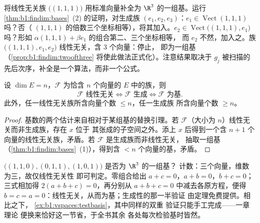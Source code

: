 \begin{example}[运行补全算法]
\label{ex:b1:findim:completion}
将线性无关族 $\bigl((1,1,1)\bigr)$ 用标准向量补全为
$\R^3$ 的一组基。运行
\cref{thm:b1:findim:bases}~(2) 的证明，对生成族 $(e_1,
e_2, e_3)$：$e_1 \in \operatorname{Vect}(1,1,1)$ 吗？否（
$(1,1,1)$ 的倍数三个坐标相等），将其加入。$e_2 \in
\operatorname{Vect}\bigl((1,1,1), e_1\bigr)$ 吗？形如
$\alpha(1,1,1) + \beta e_1$ 的组合第二、三个坐标相等，
而 $e_2$ 不然，加入之。族
$\bigl((1,1,1), e_1, e_2\bigr)$ 线性无关，含 $3$ 个向量：停止，
即为一组基（\cref{prop:b1:findim:twoofthree}
将使此做法正式化）。注意结果取决于
$g_j$ 被扫描的先后次序，补全是一个算法，而非一个公式。
\end{example}

\begin{proposition}[三取二规则]\label{prop:b1:findim:twoofthree}
设 $\dim E = n$，$\mathcal{F}$ 为恰含 $n$ 个向量的
$E$ 中的族，则
\[
\mathcal{F} \text{ 线性无关} \iff \mathcal{F} \text{ 生成} \iff
\mathcal{F} \text{ 为基}.
\]
此外，任一线性无关族所含向量个数 $\leq n$，任一生成族
所含向量个数 $\geq n$。
\end{proposition}

\begin{proof}
基数的两个估计来自相对于某组基的替换引理。若
$\mathcal{F}$（大小为 $n$）线性无关而非生成族，存在 $x$ 位于
其张成的子空间之外。添上 $x$ 后得到一个含 $n + 1$
个向量的线性无关族，矛盾。若 $\mathcal{F}$ 是生成族而非线性无关，
抽取一组基（\cref{thm:b1:findim:bases}~(1)），得到含
$< n$ 个向量的基，矛盾。
\end{proof}

\begin{example}
\label{ex:b1:findim:twoofthreerun}
$\bigl((1,1,0), (0,1,1), (1,0,1)\bigr)$ 是否为 $\R^3$ 的一组基？
计数：三个向量，维数为三，故仅线性无关性
即可判定。零组合给出 $a + c = 0$，$a + b = 0$，$b +
c = 0$；三式相加得 $2(a + b + c) = 0$，再分别从
$a + b + c = 0$ 中减去各原方程，便得 $b = c = a =
0$：线性无关，从而为基；生成性的那一半验证
由定理免费提供。相比之下，
\cref{ex:b1:vspaces:testbasis}，其中同样的双重
验证只能手工完成——一章理论
便换来恰好这一节省，于全书其余
各处每次检验基时皆然。
\end{example}


